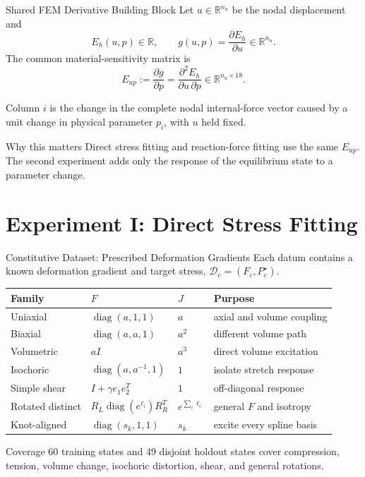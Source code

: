\documentclass[aspectratio=169,10pt]{beamer}
\newcommand{\Eup}{E_{up}}
\begin{document}
\begin{frame}{Shared FEM Derivative Building Block}
  \small
  Let $u\in\mathbb R^{n_u}$ be the nodal displacement and
  \[
    E_h(u,p)\in\mathbb R,
    \qquad
    g(u,p)=\frac{\partial E_h}{\partial u}\in\mathbb R^{n_u}.
  \]
  The common material-sensitivity matrix is
  \[
    \boxed{
      \Eup
      :=\frac{\partial g}{\partial p}
      =\frac{\partial^2E_h}{\partial u\,\partial p}
      \in\mathbb R^{n_u\times18}
    }.
  \]

  Column $i$ is the change in the complete nodal internal-force vector caused
  by a unit change in physical parameter $p_i$, with $u$ held fixed.

  \begin{alertblock}{Why this matters}
    Direct stress fitting and reaction-force fitting use the same $\Eup$.
    The second experiment adds only the response of the equilibrium state to
    a parameter change.
  \end{alertblock}
\end{frame}

\section{Experiment I: Direct Stress Fitting}

\begin{frame}{Constitutive Dataset: Prescribed Deformation Gradients}
  \scriptsize
  Each datum contains a known deformation gradient and target stress,
  $\mathcal D_c=(F_c,P_c^\star)$.

  \begin{table}
    \centering
    \renewcommand{\arraystretch}{1.25}
    \begin{tabular}{llll}
      \toprule
      Family & $F$ & $J$ & Purpose \\
      \midrule
      Uniaxial & $\operatorname{diag}(a,1,1)$ & $a$ & axial and volume coupling \\
      Biaxial & $\operatorname{diag}(a,a,1)$ & $a^2$ & different volume path \\
      Volumetric & $aI$ & $a^3$ & direct volume excitation \\
      Isochoric & $\operatorname{diag}(a,a^{-1},1)$ & $1$ & isolate stretch response \\
      Simple shear & $I+\gamma e_1e_2^T$ & $1$ & off-diagonal response \\
      Rotated distinct & $R_L\operatorname{diag}(e^{\ell_i})R_R^T$ &
        $e^{\sum_i\ell_i}$ & general $F$ and isotropy \\
      Knot-aligned & $\operatorname{diag}(s_k,1,1)$ & $s_k$ & excite every spline basis \\
      \bottomrule
    \end{tabular}
  \end{table}

  \vspace{0.4em}
  \begin{block}{Coverage}
    60 training states and 49 disjoint holdout states cover compression,
    tension, volume change, isochoric distortion, shear, and general rotations.
  \end{block}
\end{frame}
\end{document}
